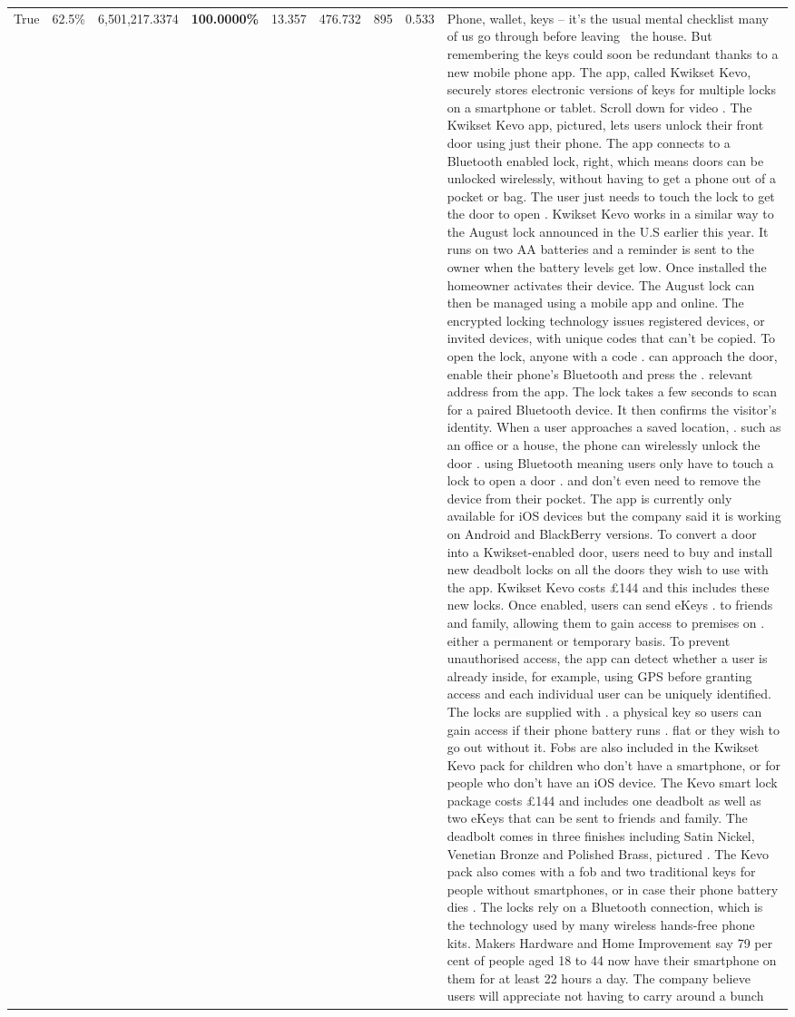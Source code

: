 \begin{table}[H]
\begin{tabular}{lllrlllll}
True & 62.5\% & 6,501,217.3374 & \bfseries \color{red} 100.0000\% & 13.357 & 476.732 & 895 & 0.533 & Phone, wallet, keys – it’s the usual mental checklist many of us go through before leaving  the house. But remembering the keys could soon be redundant thanks to a new mobile phone app. The app, called Kwikset Kevo, securely stores electronic versions of keys for multiple locks on a smartphone or tablet. Scroll down for video . The Kwikset Kevo app, pictured, lets users unlock their front door using just their phone. The app connects to a Bluetooth enabled lock, right, which means doors can be unlocked wirelessly, without having to get a phone out of a pocket or bag. The user just needs to touch the lock to get the door to open . Kwikset Kevo works in a similar way to the August lock announced in the U.S earlier this year. It runs on two AA batteries and a reminder is sent to the owner when the battery levels get low. Once installed the homeowner activates their device. The August lock can then be managed using a mobile app and online. The encrypted locking technology issues registered devices, or invited devices, with unique codes that can't be copied. To open the lock, anyone with a code . can approach the door, enable their phone's Bluetooth and press the . relevant address from the app. The lock takes a few seconds to scan for a paired Bluetooth device. It then confirms the visitor's identity. When a user approaches a saved location, . such as an office or a house, the phone can wirelessly unlock the door . using Bluetooth meaning users only have to touch a lock to open a door . and don't even need to remove the device from their pocket. The app is currently only available for iOS devices but the company said it is working on Android and BlackBerry versions. To convert a door into a Kwikset-enabled door, users need to buy and install new deadbolt locks on all the doors they wish to use with the app. Kwikset Kevo costs £144 and this includes these new locks. Once enabled, users can send eKeys . to friends and family, allowing them to gain access to premises on . either a permanent or temporary basis. To prevent unauthorised access, the app can detect whether a user is already inside, for example, using GPS before granting access and each individual user can be uniquely identified. The locks are supplied with . a physical key so users can gain access if their phone battery runs . flat or they wish to go out without it. Fobs are also included in the Kwikset Kevo pack for children who don't have a smartphone, or for people who don't have an iOS device. The Kevo smart lock package costs £144 and includes one deadbolt as well as two eKeys that can be sent to friends and family. The deadbolt comes in three finishes including Satin Nickel, Venetian Bronze and Polished Brass, pictured . The Kevo pack also comes with a fob and two traditional keys for people without smartphones, or in case their phone battery dies . The locks rely on a Bluetooth connection, which is the technology used by many wireless hands-free phone kits. Makers Hardware and Home Improvement say 79 per cent of people aged 18 to 44 now have their smartphone on them for at least 22 hours a day. The company believe users will appreciate not having to carry around a bunch 
\end{tabular}
\end{table}
